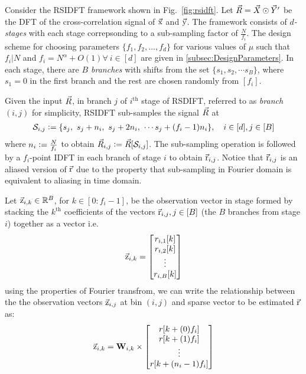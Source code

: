 \documentclass[journal,11pt,onecolumn]{IEEEtran}  %
\begin{document}
Consider the RSIDFT framework shown in Fig.~\ref{fig:rsidft}. Let $ \vec{R} =\vec{X} \odot \vec{Y}'$ be the DFT of the cross-correlation signal of $\vec{\mathrm{x}}$ and $\vec{\mathrm{y}}$. The framework consists of {\it $d$-stages} with each stage correpsonding to a sub-sampling factor of $\frac{N}{f_i}$. The design scheme for choosing parameters $\{f_1,f_2,\ldots,f_d\}$ for various values of $\mu$ such that $f_i | N$ and $f_i=N^{\alpha}+O(1) \forall ~i\in[d]$ are given in \ref{subsec:DesignParameters}. In each stage, there are {\it $B$ branches} with shifts from the set $ \{s_1, s_2, \cdots s_B\} $, where $s_1 =0$ in the first branch and the rest are chosen randomly from $[f_i]$.
	   	 	
	 Given the input $\vec{R}$, in branch $j$ of $i^{\text{th}}$ stage of RSDIFT, referred to as \textit{branch $(i,j)$} for simplicity, RSIDFT sub-samples the signal $\vec{R}$ at
\begin{align}
\label{Eqn:SamplingSets}
	 \mathcal{S}_{i,j} \mathrel{\mathop:}= \{s_j,\ s_j + n_i,\ s_j + 2n_i,\ \cdots s_j + (f_i-1) n_i\}, \quad i\in[d], j\in[B]
\end{align}
where $n_i\mathrel{\mathop:}= \frac{N}{f_i}$ to obtain $\vec{R}_{i,j}\mathrel{\mathop:}=\vec{R}[\mathcal{S}_{i,j}]$. The sub-sampling operation is followed by a $f_i$-point IDFT in each branch of stage $i$ to obtain $ \vec{\mathrm{r}}_{i,j}$. Notice that $ \vec{\mathrm{r}}_{i,j}$ is an aliased version of $\vec{\mathrm{r}}$ due to the property that sub-sampling in Fourier domain is equivalent to aliasing in time domain.

	 Let $\vec{\mathrm{z}}_{i,k}\in\mathbb{R}^{B}$,  for $k\in [0:f_i-1]$, be the observation vector in stage formed by stacking the $k^{\text{th}}$ coefficients of the vectors $\vec{\mathrm{r}}_{i,j}, j\in[B]$ (the $B$ branches from stage $i$) together as a vector i.e.
\[
	  \vec{\mathrm{z}}_{i,k} = \begin{bmatrix}
	 r_{i,1}[k] \\
	 r_{i,2}[k] \\
	 \vdots\\
	 r_{i,B}[k]
	 \end{bmatrix}  
\]
using the properties of Fourier transfrom, we can write the relationship between the the observation vectors $\vec{\mathrm{z}}_{i,j}$ at bin $(i,j)$ and sparse vector to be estimated $\vec{\mathrm{r}}$ as:
\begin{align}
	\label{Eqn:Generator Equation}
	\vec{\mathrm{z}}_{i,k}= \mathbf{W}_{i,k} \times
	\begin{bmatrix}
		r[k+(0)f_i] \\
		r[k+(1)f_i] \\
		\vdots\\
		r[k+(n_i-1)f_i]
	\end{bmatrix}
\end{align}
\end{document}
